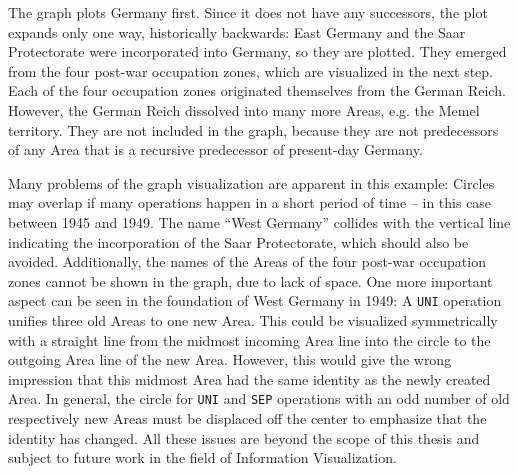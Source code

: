 The graph plots Germany first. Since it does not have any successors, the plot expands only one way, historically backwards: East Germany and the Saar Protectorate were incorporated into Germany, so they are plotted. They emerged from the four post-war occupation zones, which are visualized in the next step. Each of the four occupation zones originated themselves from the German Reich. However, the German Reich dissolved into many more Areas, e.g. the Memel territory. They are not included in the graph, because they are not predecessors of any Area that is a recursive predecessor of present-day Germany.

Many problems of the graph visualization are apparent in this example: Circles may overlap if many operations happen in a short period of time -- in this case between 1945 and 1949.
The name ``West Germany'' collides with the vertical line indicating the incorporation of the Saar Protectorate, which should also be avoided.
Additionally, the names of the Areas of the four post-war occupation zones cannot be shown in the graph, due to lack of space.
One more important aspect can be seen in the foundation of West Germany in 1949: A \texttt{UNI} operation unifies three old Areas to one new Area. This could be visualized symmetrically with a straight line from the midmost incoming Area line into the circle to the outgoing Area line of the new Area. However, this would give the wrong impression that this midmost Area had the same identity as the newly created Area. In general, the circle for \texttt{UNI} and \texttt{SEP} operations with an odd number of old respectively new Areas must be displaced off the center to emphasize that the identity has changed.
All these issues are beyond the scope of this thesis and subject to future work in the field of Information Visualization.


